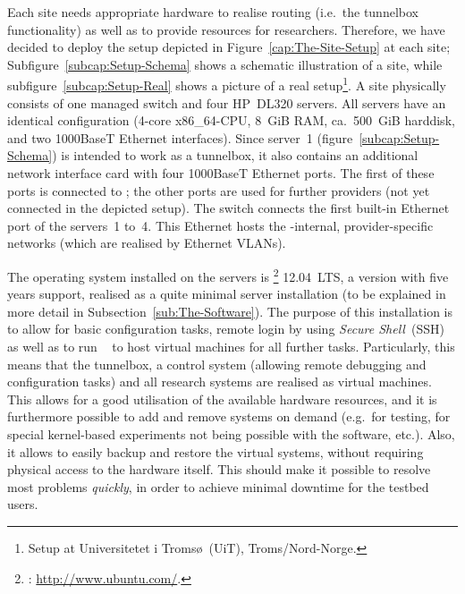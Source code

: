 Each  site needs appropriate hardware to realise routing (i.e.\ the tunnelbox functionality) as well as to provide resources for researchers. Therefore, we have decided to deploy the setup depicted in Figure~\ref{cap:The-Site-Setup} at each site; Subfigure~\ref{subcap:Setup-Schema} shows a schematic illustration of a site, while subfigure~\ref{subcap:Setup-Real} shows a picture of a real setup\footnote{Setup at \foreignlanguage{norsk}{Universitetet i Tromsø~(UiT)}, Troms/Nord-Norge.}.
A site physically consists of one managed switch and four HP~DL320 servers. All servers have an identical configuration (4-core x86\_64-CPU, 8~GiB RAM, ca.\ 500~GiB harddisk, and two 1000BaseT Ethernet interfaces). Since server~1 (figure~\ref{subcap:Setup-Schema}) is intended to work as a tunnelbox, it also contains an additional network interface card with four 1000BaseT Ethernet ports. The first of these ports is connected to ; the other ports are used for further providers (not yet connected in the depicted setup). The switch connects the first built-in Ethernet port of the servers~1 to~4. This Ethernet hosts the -internal, provider-specific networks (which are realised by Ethernet VLANs).

The operating system installed on the servers is \footnote{: \url{http://www.ubuntu.com/}.} 12.04~LTS, a version with five years support, realised as a quite minimal server installation (to be explained in more detail in Subsection~\ref{sub:The-Software}). The purpose of this installation is to allow for basic configuration tasks, remote login by using \emph{Secure Shell}~(SSH)~\cite{RFC4254} as well as to run ~\cite{VirtualBoxUserManual} to host virtual machines for all further tasks. Particularly, this means that the tunnelbox, a control system (allowing remote debugging and configuration tasks) and all research systems are realised as virtual machines. This allows for a good utilisation of the available hardware resources, and it is furthermore possible to add and remove systems on demand (e.g.\ for testing, for special kernel-based experiments not being possible with the  software, etc.). Also, it allows to easily backup and restore the virtual systems, without requiring physical access to the hardware itself. This should make it possible to resolve most problems \emph{quickly}, in order to achieve minimal downtime for the testbed users.


